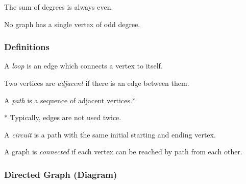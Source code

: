 \documentclass{article}
\def \proofDistance {5pt}
\begin{document}
        \begin{corollary}
            The sum of degrees is always even.
        \end{corollary}

        \begin{corollary}
            No graph has a single vertex of odd degree.
        \end{corollary}

        \vspace{\proofDistance}




        \subsubsection{Definitions}
        
            \begin{definition}
                A \textit{loop} is an edge which connects a vertex to itself.
            \end{definition}
    
            \begin{definition}
                Two vertices are \textit{adjacent} if there is an edge between them.
            \end{definition}
    
            \begin{definition}
                A \textit{path} is a sequence of adjacent vertices.*
            \end{definition}
             * Typically, edges are not used twice.
    
            \begin{definition}
                A \textit{circuit} is a path with the same initial starting and ending vertex.
            \end{definition}

            \begin{definition}
                A graph is \textit{connected} if each vertex can be reached by path from each other.
            \end{definition}

\newpage


        \subsubsection{Directed Graph (Diagram)}
\end{document}
